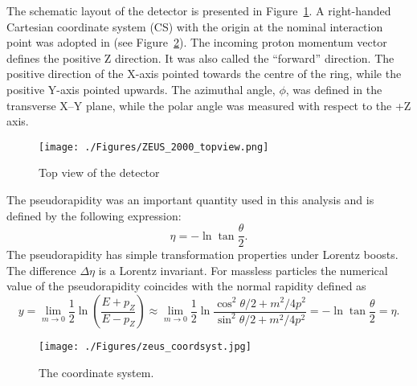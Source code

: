 The schematic layout of the \zeus detector is presented in Figure~\ref{fig:zeus2d1}. A right-handed Cartesian coordinate system (CS) with the origin at the nominal interaction point was adopted in \zeus (see Figure~\ref{fig:zeus_coordsyst}). The incoming proton momentum vector defines the positive Z direction. It was also called the ``forward'' direction. The positive direction of the X-axis pointed towards the centre of the \hera ring, while the positive Y-axis pointed upwards. The azimuthal angle, $\phi$, was defined in the transverse X--Y plane, while the polar angle was measured with respect to the +Z axis. 
\begin{landscape}
\begin{figure}[htpb]
	\centering
		\texttt{[image: ./Figures/ZEUS\_2000\_topview.png]}
	\caption{Top view of the \zeus detector}
	\label{fig:zeus2d1}
\end{figure}
\end{landscape}

The pseudorapidity was an important quantity used in this analysis and is defined by the following expression:
\begin{equation}
\eta = -\ln \tan \dfrac{\theta}{2}.
\label{eq:pseudorapidity}
\end{equation}
The pseudorapidity has simple transformation properties under Lorentz boosts. The difference $\Delta \eta$ is a Lorentz invariant. For massless particles the numerical value of the pseudorapidity coincides with the normal rapidity defined as 
\begin{equation}
y=\lim_{m\rightarrow 0}\frac{1}{2}\ln{\left(\frac{E+p_Z}{E-p_Z}\right)}\approx \lim_{m\rightarrow 0}\frac{1}{2}\ln{\frac{\cos^2{\theta/2}+m^2/4p^2}{\sin^2{\theta/2}+m^2/4p^2}} = -\ln \tan \dfrac{\theta}{2} = \eta.
\label{eq:rapidity}
\end{equation}
	
\begin{figure}[htpb]
	\centering
		\texttt{[image: ./Figures/zeus\_coordsyst.jpg]}
	\caption{The \zeus coordinate system.}
	\label{fig:zeus_coordsyst}
\end{figure}
